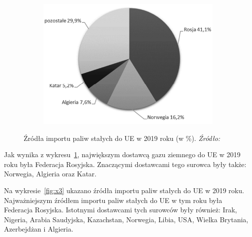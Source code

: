 \documentclass[polish, twoside, 12pt, a4paper]{article}
\theoremstyle{definition}
\theoremstyle{plain}
\theoremstyle{remark}
\begin{document}
\begin{figure}[hbt]
  \centering

  \begin{subfigure}[t]{0.45\textwidth}
    \hspace{-0.4cm}
    \includegraphics[width=1.12\textwidth]{./out_figures/figure_2}
  \end{subfigure}

  \captionsetup{margin=10pt,font=small,labelfont=bf,width=.8\textwidth}

  \caption[Źródła importu paliw stałych do UE w 2019 roku (w \%).]{Źródła importu paliw stałych do UE w 2019 roku (w \%). \textit{Źródło:} \cite{pangsykania2022}}\label{fig:x2}
\end{figure}

Jak wynika z wykresu~\ref{fig:x2}, największym dostawcą gazu ziemnego do UE w 2019 roku była Federacja Rosyjska. Znaczącymi dostawcami tego surowca były także: Norwegia, Algieria oraz Katar. 

Na wykresie~\ref{fig:x3} ukazano źródła importu paliw stałych do UE w 2019 roku. Najważniejszym źródłem importu paliw stałych do UE w tym roku była Federacja Rosyjska. Istotnymi dostawcami tych surowców były również: Irak, Nigeria, Arabia Saudyjska, Kazachstan, Norwegia, Libia, USA, Wielka Brytania, Azerbejdżan i Algieria. 
\end{document}
